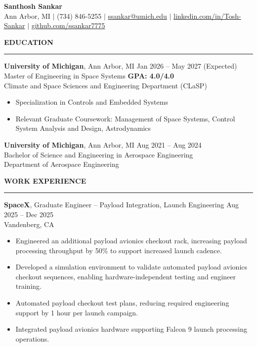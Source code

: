 \documentclass[10pt]{article}
\newcommand{\ressection}[1]{
  \vspace{0.25em}
  {\large\bfseries #1}\par
  \vspace{0.08em}\hrule\vspace{0.20em}
}
\begin{document}
\begin{center}
{\LARGE {\bfseries Santhosh Sankar}} \\
Ann Arbor, MI \enspace $\vert$ \enspace (734) 846-5255 \enspace $\vert$ \enspace
\href{mailto:ssankar@umich.edu}{ssankar@umich.edu} \enspace $\vert$ \enspace
\href{https://www.linkedin.com/in/santhosh-sankar-3241521b8/}{linkedin.com/in/Tosh-Sankar} \enspace $\vert$ \enspace
\href{https://github.com/ssankar7775}{github.com/ssankar7775}
\end{center}

\ressection{EDUCATION}

{\bfseries University of Michigan}, Ann Arbor, MI \hfill Jan 2026 -- May 2027 (Expected) \\
Master of Engineering in Space Systems \hfill {\bfseries GPA: 4.0/4.0} \\
Climate and Space Sciences and Engineering Department (CLaSP)

\begin{itemize}
  \item Specialization in Controls and Embedded Systems
  \item Relevant Graduate Coursework: Management of Space Systems, Control System Analysis and Design, Astrodynamics
\end{itemize}

{\bfseries University of Michigan}, Ann Arbor, MI \hfill Aug 2021 -- Aug 2024 \\
Bachelor of Science and Engineering in Aerospace Engineering \\
Department of Aerospace Engineering

\ressection{WORK EXPERIENCE}

{\bfseries SpaceX}, Graduate Engineer -- Payload Integration, Launch Engineering \hfill Aug 2025 -- Dec 2025 \\
Vandenberg, CA
\begin{itemize}
\item Engineered an additional payload avionics checkout rack, increasing payload processing throughput by 50\% to support increased launch cadence.
\item Developed a simulation environment to validate automated payload avionics checkout sequences, enabling hardware-independent testing and engineer training.
\item Automated payload checkout test plans, reducing required engineering support by 1 hour per launch campaign.
\item Integrated payload avionics hardware supporting Falcon 9 launch processing operations.
\end{itemize}
\end{document}
